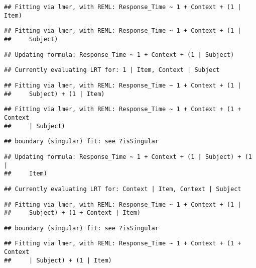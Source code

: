 \documentclass[
]{article}
\begin{document}
\begin{verbatim}
## Fitting via lmer, with REML: Response_Time ~ 1 + Context + (1 | Item)
\end{verbatim}

\begin{verbatim}
## Fitting via lmer, with REML: Response_Time ~ 1 + Context + (1 |
##     Subject)
\end{verbatim}

\begin{verbatim}
## Updating formula: Response_Time ~ 1 + Context + (1 | Subject)
\end{verbatim}

\begin{verbatim}
## Currently evaluating LRT for: 1 | Item, Context | Subject
\end{verbatim}

\begin{verbatim}
## Fitting via lmer, with REML: Response_Time ~ 1 + Context + (1 |
##     Subject) + (1 | Item)
\end{verbatim}

\begin{verbatim}
## Fitting via lmer, with REML: Response_Time ~ 1 + Context + (1 + Context
##     | Subject)
\end{verbatim}

\begin{verbatim}
## boundary (singular) fit: see ?isSingular
\end{verbatim}

\begin{verbatim}
## Updating formula: Response_Time ~ 1 + Context + (1 | Subject) + (1 |
##     Item)
\end{verbatim}

\begin{verbatim}
## Currently evaluating LRT for: Context | Item, Context | Subject
\end{verbatim}

\begin{verbatim}
## Fitting via lmer, with REML: Response_Time ~ 1 + Context + (1 |
##     Subject) + (1 + Context | Item)
\end{verbatim}

\begin{verbatim}
## boundary (singular) fit: see ?isSingular
\end{verbatim}

\begin{verbatim}
## Fitting via lmer, with REML: Response_Time ~ 1 + Context + (1 + Context
##     | Subject) + (1 | Item)
\end{verbatim}
\end{document}
